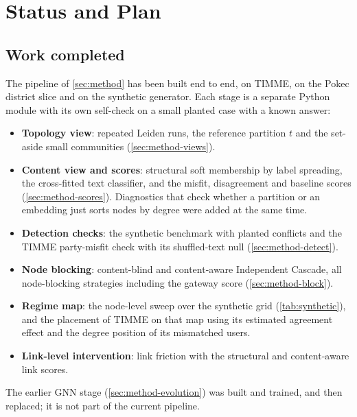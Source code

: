 \section{Status and Plan}
\label{sec:status}

\subsection{Work completed}
The pipeline of \cref{sec:method} has been built end to end, on TIMME, on the Pokec
district slice and on the synthetic generator. Each stage is a separate Python module
with its own self-check on a small planted case with a known answer:
\begin{itemize}
  \item \textbf{Topology view}: repeated Leiden runs, the reference partition $t$ and
        the set-aside small communities (\cref{sec:method-views}).
  \item \textbf{Content view and scores}: structural soft membership by label
        spreading, the cross-fitted text classifier, and the misfit, disagreement and
        baseline scores (\cref{sec:method-scores}). Diagnostics that check whether a
        partition or an embedding just sorts nodes by degree were added at the same
        time.
  \item \textbf{Detection checks}: the synthetic benchmark with planted conflicts and
        the TIMME party-misfit check with its shuffled-text null
        (\cref{sec:method-detect}).
  \item \textbf{Node blocking}: content-blind and content-aware Independent Cascade,
        all node-blocking strategies including the gateway score
        (\cref{sec:method-block}).
  \item \textbf{Regime map}: the node-level sweep over the synthetic grid
        (\cref{tab:synthetic}), and the placement of TIMME on that map using its
        estimated agreement effect and the degree position of its mismatched users.
  \item \textbf{Link-level intervention}: link friction with the structural and
        content-aware link scores.
\end{itemize}
The earlier GNN stage (\cref{sec:method-evolution}) was built and trained, and then
replaced; it is not part of the current pipeline.

